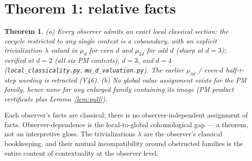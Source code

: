 \documentclass[11pt]{article}
\newtheorem{theorem}{Theorem}\newtheorem{lemma}{Lemma}\newtheorem{conjecture}{Conjecture}
\begin{document}
\section{Theorem 1: relative facts}
\begin{theorem}\label{thm:facts}
(a) Every observer admits an exact local classical section: the cocycle restricted to
any single context is a coboundary, with an explicit trivialization $\lambda$ valued in
$\mu_d$ for even $d$ and $\mu_{2d}$ for odd $d$ (sharp at $d=3$); verified at $d=2$ (all six PM
contexts), $d=3$, and $d=4$ (\texttt{local\_classicality.py}, \texttt{mu\_d\_valuation.py}). The
earlier $\mu_{4d}$ / even-$d$ half-$\tau$-step wording is retracted (V46).
(b) No global value assignment exists for the PM family, hence none for any enlarged
family containing its image (PM product certificate plus Lemma~\ref{lem:pull}).
\end{theorem}
Each observer's facts are classical; there is no observer-independent assignment of
facts. Observer-dependence is the local-to-global cohomological gap --- a theorem, not
an interpretive gloss. The trivializations $\lambda$ are the observer's classical
bookkeeping, and their mutual incompatibility around obstructed families is the entire
content of contextuality at the observer level.
\end{document}
